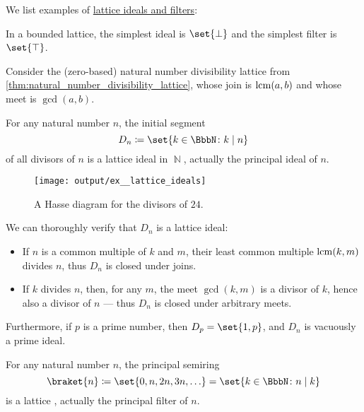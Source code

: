 \begin{example}\label{ex:def:lattice_ideal}
  We list examples of \hyperref[def:lattice_ideal]{lattice ideals and filters}:
  \begin{thmenum}
     In a bounded lattice, the simplest ideal is \( \set{ \bot } \) and the simplest filter is \( \set{ \top } \).

     Consider the (zero-based) natural number divisibility lattice from \cref{thm:natural_number_divisibility_lattice}, whose join is \( \operatorname{lcm}(a, b) \) and whose meet is \( \gcd(a, b) \).

    For any natural number \( n \), the initial segment
    \begin{equation*}
      D_n \coloneqq \set{ k \in \BbbN \colon k \mid n }
    \end{equation*}
    of all divisors of \( n \) is a lattice ideal in \( \BbbN \), actually the principal ideal of \( n \).

    \begin{figure}[!ht]
      \centering
      \texttt{[image: output/ex\_\_lattice\_ideals]}
      \caption{A Hasse diagram for the divisors of \( 24 \).}
      \label{fig:ex:def:lattice_ideal/lattice}
    \end{figure}

    We can thoroughly verify that \( D_n \) is a lattice ideal:
    \begin{itemize}
      \item If \( n \) is a common multiple of \( k \) and \( m \), their least common multiple \( \operatorname{lcm}(k, m) \) divides \( n \), thus \( D_n \) is closed under joins.
      \item If \( k \) divides \( n \), then, for any \( m \), the meet \( \gcd(k, m) \) is a divisor of \( k \), hence also a divisor of \( n \) --- thus \( D_n \) is closed under arbitrary meets.
    \end{itemize}

    Furthermore, if \( p \) is a prime number, then \( D_p = \set{ 1, p } \), and \( D_n \) is vacuously a prime ideal.

     For any natural number \( n \), the principal semiring 
    \begin{equation*}
      \braket{ n } \coloneqq \set{ 0, n, 2n, 3n, \ldots } = \set{ k \in \BbbN \colon n \mid k }
    \end{equation*}
    is a lattice , actually the principal filter of \( n \).


\end{thmenum}
\end{example}
